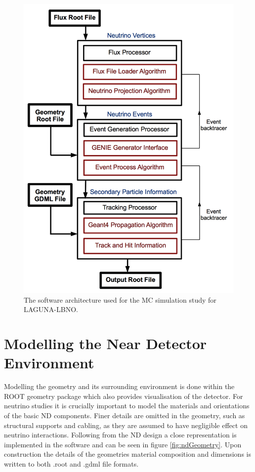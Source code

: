 \begin{figure}[hbtp]
\begin{center}
  \includegraphics[width=120mm]{Chapter4/figures/softwareProcessDiagram.png}
  \caption{The software architecture used for the MC simulation study for LAGUNA-LBNO.}
  \label{fig:softwareArch}
\end{center}
\end{figure}

\section{Modelling the Near Detector Environment}
Modelling the geometry and its surrounding environment is done within the ROOT geometry package which also provides visualisation of the detector. For neutrino studies it is crucially important to model the materials and orientations of the basic ND components. Finer details are omitted in the geometry, such as structural supports and cabling, as they are assumed to have negligible effect on neutrino interactions. Following from the ND design a close representation is implemented in the software and can be seen in figure \ref{fig:ndGeometry}. Upon construction the details of the geometries material composition and dimensions is written to both .root and .gdml file formats.

